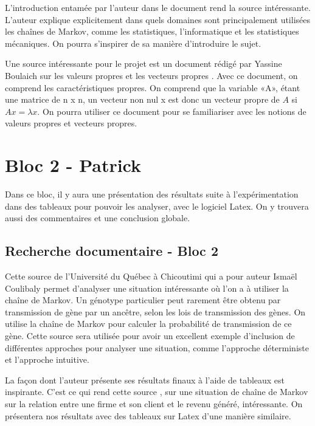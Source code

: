\documentclass[10pt]{article}
\begin{document}
 L’introduction entamée par l’auteur dans le document \cite{nonReversibleMarkov} rend la source intéressante. L’auteur explique explicitement dans quels domaines sont principalement utilisées les chaînes de Markov, comme les statistiques, l’informatique et les statistiques mécaniques. On pourra s’inspirer de sa manière d’introduire le sujet.

 Une source intéressante pour le projet est un document rédigé par Yassine Boulaich sur les valeurs propres et les vecteurs propres \cite{puissanceInverse}. Avec ce document, on comprend les caractéristiques propres. On comprend que la variable «A», étant une matrice de n x n, un vecteur non nul x est donc un vecteur propre de $A$ si $A x = \lambda x$. On pourra utiliser ce document pour se familiariser avec les notions de valeurs propres et vecteurs propres. 


\section{Bloc 2 - Patrick}
Dans ce bloc, il y aura une présentation des résultats suite à l'expérimentation dans des tableaux pour pouvoir les analyser, avec le logiciel Latex. On y trouvera aussi des commentaires et une conclusion globale.

\subsection{Recherche documentaire - Bloc 2}


Cette source de l’Université du Québec à Chicoutimi qui a pour auteur Ismaël Coulibaly \cite{docUQAC} permet d’analyser une situation intéressante où l’on a à utiliser la chaîne de Markov. Un génotype particulier peut rarement être obtenu par transmission de gène par un ancêtre, selon les lois de transmission des gènes. On utilise la chaîne de Markov pour calculer la probabilité de transmission de ce gène. Cette source sera utilisée pour avoir un excellent exemple d'inclusion de différentes approches pour analyser une situation, comme l'approche déterministe et l'approche intuitive. 

La façon dont l’auteur présente ses résultats finaux à l’aide de tableaux est inspirante. C’est ce qui rend cette source \cite{customerRelations}, sur une situation de chaîne de Markov sur la relation entre une firme et son client et le revenu généré, intéressante. On présentera nos résultats avec des tableaux sur Latex d’une manière similaire.

\nocite{*}


\end{document}
